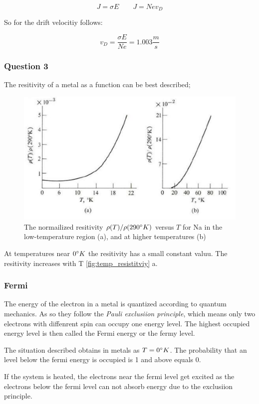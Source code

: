 $$J = \sigma E \qquad J = Nev_D$$

So for the drift velocitiy follows:

$$v_D =  \frac{\sigma E}{N e} = 1.003 \frac{m}{s}$$

\subsubsection*{Question 3}

The resitivity of a metal as a function can be best described;

\begin{figure}[H]
    \centering
    \includegraphics[width=0.6\linewidth]{Graphics/Chapter1/temp_resistitviy.png}
    \caption{The normailized resitivity $\rho(T)/\rho(290\degree K)$ versus $T$ 
    for Na in the low-temperature region (a), and at higher temperatures (b) 
    \cite[Elementary Solid State Physics p. 148]{elementary_SSP} }
    \label{fig:temp_resistitviy}
\end{figure}

At temperatures near $0 \degree K$ the resitivity has a small constant 
valuu. The resitivity increases with T \autoref{fig:temp_resistitviy} a.

\subsubsection*{Fermi}

The energy of the electron in a metal is quantized according to quantum mechanics.
As so they follow the \textit{Pauli exclusiion principle}, which means only two 
electrons with diffenrent spin can occupy one energy level.
The highest occupied energy level is then called the Fermi energy or the fermy
level.

The situation described obtains in metals as $T=0 \degree K$. The probability that 
an level below the fermi energy is occupied is 1 and above equals 0.

If the system is heated, the electrons near the fermi level get excited as 
the electrons below the fermi level can not absorb energy due to the exclusiion
principle.

